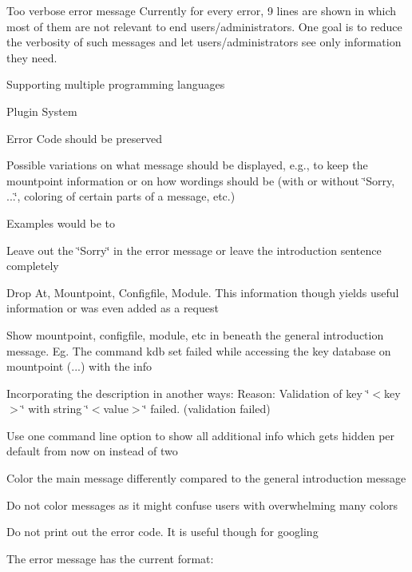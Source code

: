 Too verbose error message Currently for every error, 9 lines are shown in which most of them are not relevant to end users/administrators. One goal is to reduce the verbosity of such messages and let users/administrators see only information they need.


\begin{DoxyItemize}
\item Supporting multiple programming languages
\item Plugin System
\item Error Code should be preserved
\end{DoxyItemize}

Possible variations on what message should be displayed, e.\+g., to keep the mountpoint information or on how wordings should be (with or without \char`\"{}\+Sorry, ...\char`\"{}, coloring of certain parts of a message, etc.)

Examples would be to


\begin{DoxyItemize}
\item Leave out the \char`\"{}\+Sorry\char`\"{} in the error message or leave the introduction sentence completely
\item Drop {\ttfamily At}, {\ttfamily Mountpoint}, {\ttfamily Configfile}, {\ttfamily Module}. This information though yields useful information or was even added as a request
\item Show mountpoint, configfile, module, etc in beneath the general introduction message. Eg. {\ttfamily The command kdb set failed while accessing the key database on mountpoint (...) with the info}
\item Incorporating the description in another ways\+: {\ttfamily Reason\+: Validation of key \char`\"{}$<$key$>$\char`\"{} with string \char`\"{}$<$value$>$\char`\"{} failed. (validation failed)}
\item Use one command line option to show all additional info which gets hidden per default from now on instead of two
\item Color the main message differently compared to the general introduction message
\item Do not color messages as it might confuse users with overwhelming many colors
\item Do not print out the error code. It is useful though for googling
\end{DoxyItemize}

The error message has the current format\+:


